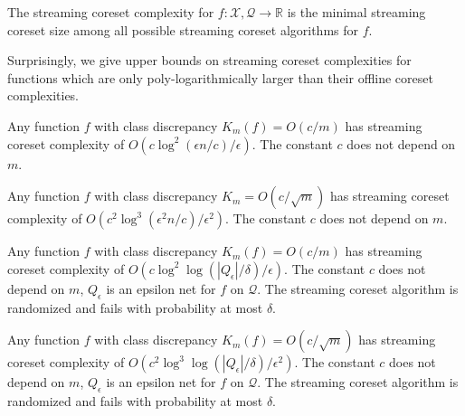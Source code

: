 \documentclass[anon,12pt]{colt2019} %
\newcommand{\R}{\mathbb{R}}
\newcommand{\eps}{\epsilon}
\newcommand{\F}{\mathcal{F}}
\newcommand{\X}{\mathcal{X}}
\newcommand{\Q}{\mathcal{Q}}
\begin{document}
\begin{definition}  
The streaming coreset complexity for $f:\X,\Q \rightarrow \R$ is the minimal streaming coreset size among all possible 
streaming coreset algorithms for $f$.
\end{definition}


\noindent Surprisingly, we give upper bounds on streaming coreset complexities for functions which are only poly-logarithmically larger than their offline coreset complexities. %

\begin{theorem} \label{thm:streaming11}
Any function $f$ with class discrepancy $K_m(f) = O(c/m)$ has streaming coreset complexity of $O\left(c\log^2(\eps n/c)/\eps\right)$.
The constant $c$ does not depend on $m$.
\end{theorem}

\begin{theorem} \label{thm:streaming21}
Any function $f$ with class discrepancy $K_m = O(c/\sqrt{m})$ has streaming coreset complexity of $O\left(c^2\log^3(\eps^2 n/c) /\eps^2\right)$.
The constant $c$ does not depend on $m$.
\end{theorem}

\begin{theorem} \label{thm:streaming12}
Any function $f$ with class discrepancy $K_m(f) = O(c/m)$ has streaming coreset complexity of $O\left(c\log^2\log(|Q_\eps|/\delta)/\eps\right)$.
The constant $c$ does not depend on $m$, $Q_\eps$ is an epsilon net for $f$ on $\Q$. 
The streaming coreset algorithm is randomized and fails with probability at most $\delta$.
\end{theorem}

\begin{theorem} \label{thm:streaming22}
Any function $f$ with class discrepancy $K_m(f) = O(c/\sqrt{m})$ has streaming coreset complexity of $O\left(c^2\log^3\log(|Q_\eps|/\delta) /\eps^2\right)$.
The constant $c$ does not depend on $m$, $Q_\eps$ is an epsilon net for $f$ on $\Q$. 
The streaming coreset algorithm is randomized and fails with probability at most $\delta$.
\end{theorem}

\end{document}
